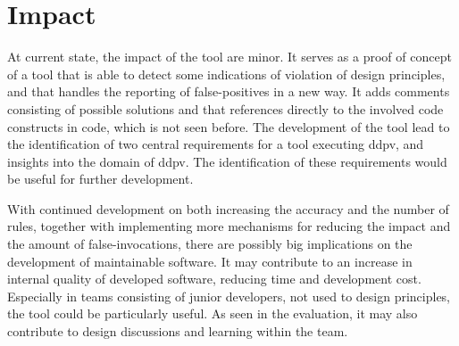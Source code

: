 \documentclass{report}
\begin{document}



\section{Impact}

At current state, the impact of the tool are minor. It serves as a proof of concept of a tool that is able to detect some indications of violation of design principles, and that handles the reporting of false-positives in a new way. It adds comments consisting of possible solutions and that references directly to the involved code constructs in code, which is not seen before. The development of the tool lead to the identification of two central requirements for a tool executing \gls{ddpv}, and insights into the domain of \gls{ddpv}. The identification of these requirements would be useful for further development.

With continued development on both increasing the accuracy and the number of rules, together with implementing more mechanisms for reducing the impact and the amount of false-invocations, there are possibly big implications on the development of maintainable software. It may contribute to an increase in internal quality of developed software, reducing time and development cost. Especially in teams consisting of junior developers, not used to design principles, the tool could be particularly useful. As seen in the evaluation, it may also contribute to design discussions and learning within the team.
\end{document}
